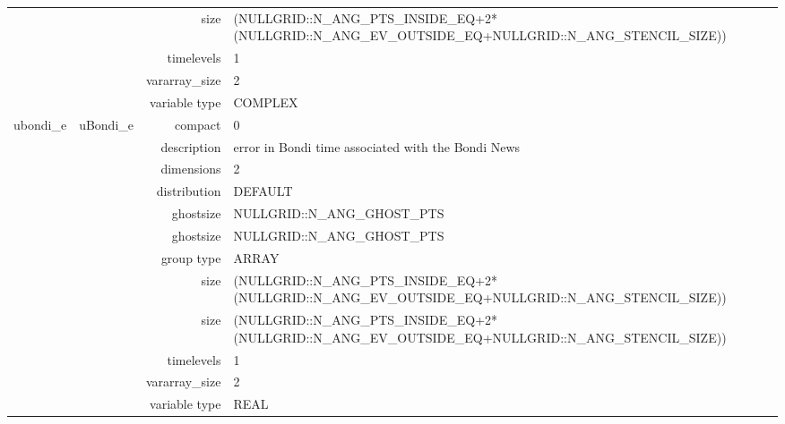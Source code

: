 \begin{tabular*}{150mm}{|c|c@{\extracolsep{\fill}}|rl|}
& ~ & size & (NULLGRID::N\_ANG\_PTS\_INSIDE\_EQ+2*(NULLGRID::N\_ANG\_EV\_OUTSIDE\_EQ+NULLGRID::N\_ANG\_STENCIL\_SIZE)) \\ 
 &  & timelevels & 1 \\ 
 &  & vararray\_size & 2 \\ 
 &  & variable type & COMPLEX \\ 
\hline 
ubondi\_e & uBondi\_e & compact & 0 \\ 
 &  & description & error in Bondi time associated with the Bondi News \\ 
 &  & dimensions & 2 \\ 
 &  & distribution & DEFAULT \\ 
 &  & ghostsize & NULLGRID::N\_ANG\_GHOST\_PTS \\ 
& ~ & ghostsize & NULLGRID::N\_ANG\_GHOST\_PTS \\ 
 &  & group type & ARRAY \\ 
 &  & size & (NULLGRID::N\_ANG\_PTS\_INSIDE\_EQ+2*(NULLGRID::N\_ANG\_EV\_OUTSIDE\_EQ+NULLGRID::N\_ANG\_STENCIL\_SIZE)) \\ 
& ~ & size & (NULLGRID::N\_ANG\_PTS\_INSIDE\_EQ+2*(NULLGRID::N\_ANG\_EV\_OUTSIDE\_EQ+NULLGRID::N\_ANG\_STENCIL\_SIZE)) \\ 
 &  & timelevels & 1 \\ 
 &  & vararray\_size & 2 \\ 
 &  & variable type & REAL \\ 
\hline 
\end{tabular*} 



\vspace{5mm}
\vspace{5mm}

